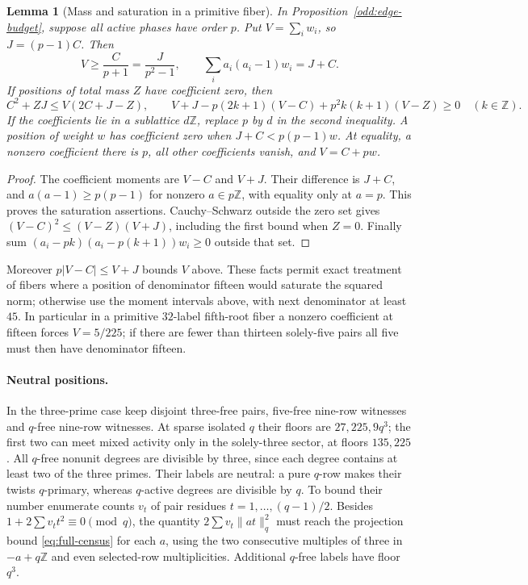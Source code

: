 \documentclass[11pt]{amsart}
\numberwithin{equation}{section}
\newtheorem{lemma}[theorem]{Lemma}
\theoremstyle{definition}
\theoremstyle{plain}
\newcommand{\ZZ}{\mathbb Z}
\begin{document}
\begin{lemma}[Mass and saturation in a primitive fiber]\label{odd:fiber-lower-mass}
In Proposition~\ref{odd:edge-budget}, suppose all active phases have
order $p$. Put $V=\sum_iw_i$, so $J=(p-1)C$. Then
\[
 V\ge\frac{C}{p+1}=\frac{J}{p^2-1},\qquad
 \sum_i a_i(a_i-1)w_i=J+C.
\]
If positions of total mass $Z$ have coefficient zero, then
\[
 C^2+ZJ\le V(2C+J-Z),\qquad
 V+J-p(2k+1)(V-C)+p^2k(k+1)(V-Z)\ge0
 \quad(k\in\mathbb Z).
\]
If the coefficients lie in a sublattice $d\ZZ$, replace $p$ by $d$
in the second inequality. A position of weight $w$ has coefficient zero when
$J+C<p(p-1)w$. At equality, a nonzero coefficient there is $p$,
all other coefficients vanish, and $V=C+pw$.
\end{lemma}
\begin{proof}
The coefficient moments are $V-C$ and $V+J$. Their difference is
$J+C$, and $a(a-1)\ge p(p-1)$ for nonzero $a\in p\mathbb Z$,
with equality only at $a=p$. This proves the saturation assertions.
Cauchy--Schwarz outside the zero set gives
$(V-C)^2\le(V-Z)(V+J)$, including the first bound when $Z=0$.
Finally sum $(a_i-pk)(a_i-p(k+1))w_i\ge0$ outside that set.
\end{proof}

Moreover $p|V-C|\le V+J$ bounds $V$ above. These facts
permit exact treatment of fibers where a position of denominator
fifteen would saturate the squared norm; otherwise use the moment
intervals above, with next denominator at least $45$. In particular
in a primitive $32$-label fifth-root fiber a nonzero coefficient at
fifteen forces $V=5/225$; if there are fewer than thirteen solely-five
pairs all five must then have denominator fifteen.

\paragraph{Neutral positions.}
In the three-prime case keep disjoint three-free pairs, five-free
nine-row witnesses and $q$-free nine-row witnesses. At sparse isolated
$q$ their floors are $27,225,9q^3$; the first two can meet mixed
activity only in the solely-three sector, at floors $135,225$.
All $q$-free nonunit degrees are divisible by three, since each degree
contains at least two of the three primes. Their labels are neutral:
a pure $q$-row makes their twists $q$-primary, whereas $q$-active
degrees are divisible by $q$. To bound their number enumerate counts $v_t$ of pair residues
$t=1,\ldots,(q-1)/2$. Besides $1+2\sum v_tt^2\equiv0\pmod q$,
the quantity $2\sum v_t\|at\|_q^2$ must reach the projection bound
\eqref{eq:full-census} for each $a$, using the two consecutive
multiples of three in $-a+q\ZZ$ and even selected-row multiplicities.
Additional $q$-free labels have floor $q^3$.
\end{document}
